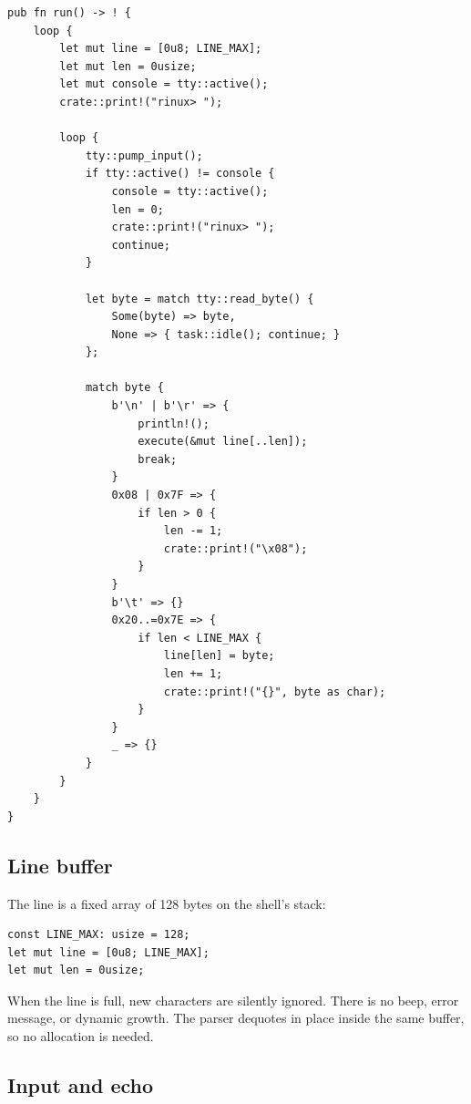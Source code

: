 \begin{lstlisting}[caption={Structure of the shell loop.},label={lst:shellloop}]
pub fn run() -> ! {
    loop {
        let mut line = [0u8; LINE_MAX];
        let mut len = 0usize;
        let mut console = tty::active();
        crate::print!("rinux> ");

        loop {
            tty::pump_input();
            if tty::active() != console {
                console = tty::active();
                len = 0;
                crate::print!("rinux> ");
                continue;
            }

            let byte = match tty::read_byte() {
                Some(byte) => byte,
                None => { task::idle(); continue; }
            };

            match byte {
                b'\n' | b'\r' => {
                    println!();
                    execute(&mut line[..len]);
                    break;
                }
                0x08 | 0x7F => {
                    if len > 0 {
                        len -= 1;
                        crate::print!("\x08");
                    }
                }
                b'\t' => {}
                0x20..=0x7E => {
                    if len < LINE_MAX {
                        line[len] = byte;
                        len += 1;
                        crate::print!("{}", byte as char);
                    }
                }
                _ => {}
            }
        }
    }
}
\end{lstlisting}

\subsection{Line buffer}

The line is a fixed array of 128 bytes on the shell's stack:

\begin{lstlisting}[caption={Line buffer.},label={lst:linebuffer}]
const LINE_MAX: usize = 128;
let mut line = [0u8; LINE_MAX];
let mut len = 0usize;
\end{lstlisting}

When the line is full, new characters are silently ignored. There is no
beep, error message, or dynamic growth. The parser dequotes in place inside
the same buffer, so no allocation is needed.

\subsection{Input and echo}

